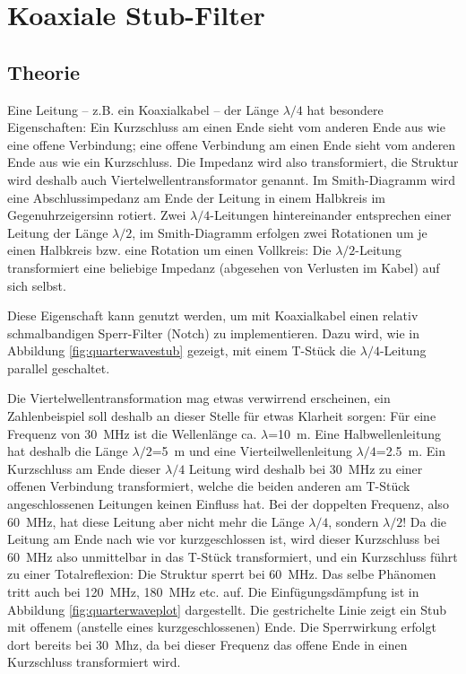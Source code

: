 \documentclass[twoside,a4paper,11pt,halfparskip,DIV=11,notitlepage]{scrartcl}
\begin{document}
\section{Koaxiale Stub-Filter}
\subsection{Theorie}
Eine Leitung -- z.B. ein Koaxialkabel -- der Länge $\lambda/4$ hat besondere
Eigenschaften: Ein Kurzschluss am einen Ende sieht vom anderen Ende aus wie
eine offene Verbindung; eine offene Verbindung am einen Ende sieht vom anderen
Ende aus wie ein Kurzschluss. Die Impedanz wird also transformiert, die
Struktur wird deshalb auch Viertelwellentransformator genannt. Im Smith-Diagramm
wird eine Abschlussimpedanz am Ende der Leitung in einem Halbkreis im Gegenuhrzeigersinn
rotiert. Zwei $\lambda/4$-Leitungen hintereinander entsprechen einer Leitung
der Länge $\lambda/2$, im Smith-Diagramm erfolgen zwei Rotationen um je einen
Halbkreis bzw. eine Rotation um einen Vollkreis: Die $\lambda/2$-Leitung
transformiert eine beliebige Impedanz (abgesehen von Verlusten im Kabel) auf
sich selbst.

Diese Eigenschaft kann genutzt werden, um mit Koaxialkabel einen relativ
schmalbandigen Sperr-Filter (Notch) zu implementieren. Dazu wird, wie in Abbildung
\ref{fig:quarterwavestub} gezeigt, mit einem T-Stück die $\lambda/4$-Leitung
parallel geschaltet. 

Die Viertelwellentransformation mag etwas verwirrend erscheinen, ein Zahlenbeispiel
soll deshalb an dieser Stelle für etwas Klarheit sorgen: Für eine Frequenz von
30~MHz ist die Wellenlänge ca. $\lambda$=10~m. Eine Halbwellenleitung hat deshalb
die Länge $\lambda/2$=5~m und eine Vierteilwellenleitung $\lambda/4$=2.5~m. Ein
Kurzschluss am Ende dieser $\lambda/4$ Leitung wird deshalb bei 30~MHz zu einer
offenen Verbindung transformiert, welche die beiden anderen am T-Stück
angeschlossenen Leitungen keinen Einfluss hat. Bei der doppelten Frequenz, also
60~MHz, hat diese Leitung aber nicht mehr die Länge  $\lambda/4$, sondern
$\lambda/2$! Da die Leitung am Ende nach wie vor kurzgeschlossen ist, wird dieser
Kurzschluss bei 60~MHz also unmittelbar in das T-Stück transformiert, und ein
Kurzschluss führt zu einer Totalreflexion: Die Struktur sperrt bei 60~MHz. Das
selbe Phänomen tritt auch bei 120~MHz, 180~MHz etc. auf. Die Einfügungsdämpfung
ist in Abbildung \ref{fig:quarterwaveplot} dargestellt. Die gestrichelte Linie
zeigt ein Stub mit offenem (anstelle eines kurzgeschlossenen) Ende. Die Sperrwirkung
erfolgt dort bereits bei 30~Mhz, da bei dieser Frequenz das offene Ende in einen
Kurzschluss transformiert wird.
\end{document}
